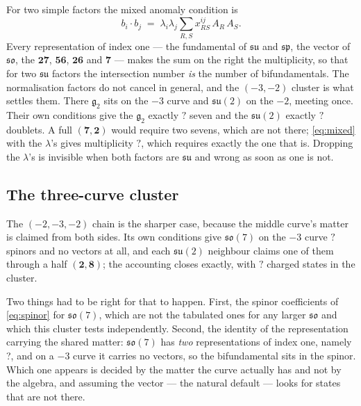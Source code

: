 \documentclass[11pt,a4paper]{article}
\newcommand{\SFSOSevenIndexOne}{?}\newcommand{\SFClusterCount}{?}
\newcommand{\SFGTwoSevens}{?}\newcommand{\SFGTwoSUTwoDoublets}{?}
\newcommand{\SFGTwoSharedMult}{?}\newcommand{\SFSOSevenSpinors}{?}
\newcommand{\SFClusterThreeCharged}{?}\newcommand{\SFPTwoHfour}{?}
\newcommand{\g}[1]{\mathfrak{#1}}
\theoremstyle{definition}
\begin{document}
For two simple factors the mixed anomaly condition is
%
\begin{equation}
b_i \cdot b_j \;=\; \lambda_i \lambda_j
\sum_{R,S} x^{ij}_{RS}\, A_R\, A_S .
\label{eq:mixed}
\end{equation}
%
Every representation of index one --- the fundamental of $\g{su}$ and
$\g{sp}$, the vector of $\g{so}$, the $\mathbf{27}$, $\mathbf{56}$,
$\mathbf{26}$ and $\mathbf{7}$ --- makes the sum on the right the
multiplicity, so that for two $\g{su}$ factors the intersection number
\emph{is} the number of bifundamentals. The normalisation factors do not
cancel in general, and the $(-3,-2)$ cluster is what settles them. There
$\g{g}_2$ sits on the $-3$ curve and $\g{su}(2)$ on the $-2$, meeting once.
Their own conditions give the $\g{g}_2$ exactly $\SFGTwoSevens$ seven and the
$\g{su}(2)$ exactly $\SFGTwoSUTwoDoublets$ doublets. A full
$(\mathbf{7},\mathbf{2})$ would require two sevens, which are not there;
\cref{eq:mixed} with the $\lambda$'s gives multiplicity
$\SFGTwoSharedMult$, which requires exactly the one that is. Dropping the
$\lambda$'s is invisible when both factors are $\g{su}$ and wrong as soon as
one is not.

\subsection{The three-curve cluster}

The $(-2,-3,-2)$ chain is the sharper case, because the middle curve's matter
is claimed from both sides. Its own conditions give $\g{so}(7)$ on the $-3$
curve $\SFSOSevenSpinors$ spinors and no vectors at all, and each $\g{su}(2)$
neighbour claims one of them through a half
$(\mathbf{2},\mathbf{8})$; the accounting closes exactly, with
$\SFClusterThreeCharged$ charged states in the cluster.

Two things had to be right for that to happen. First, the spinor coefficients
of \cref{eq:spinor} for $\g{so}(7)$, which are not the tabulated ones for any
larger $\g{so}$ and which this cluster tests independently. Second, the
identity of the representation carrying the shared matter: $\g{so}(7)$ has
\emph{two} representations of index one, namely \SFSOSevenIndexOne, and on a
$-3$ curve it carries no vectors, so the bifundamental sits in the spinor.
Which one appears is decided by the matter the curve actually has and not by
the algebra, and assuming the vector --- the natural default --- looks for
states that are not there.

\end{document}

